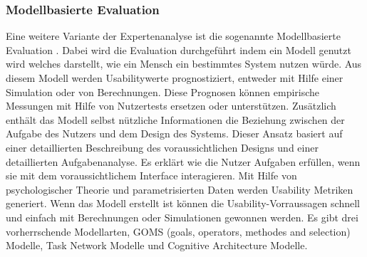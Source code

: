 \documentclass[draft=false
              ,paper=a4
              ,twoside=false
              ,fontsize=11pt
              ,headsepline
              ,BCOR10mm
              ,DIV11
              ]{scrbook}
\begin{document}
\subsubsection{Modellbasierte Evaluation} %
\label{ssub:modellbasierte_evaluation}
Eine weitere Variante der Expertenanalyse ist die sogenannte Modellbasierte Evaluation \cite{kieras_human-computer_2003}. Dabei wird die Evaluation durchgeführt indem ein Modell genutzt wird welches darstellt, wie ein Mensch ein bestimmtes System nutzen würde. Aus diesem Modell werden Usabilitywerte prognostiziert, entweder mit Hilfe einer Simulation oder von Berechnungen. Diese Prognosen können empirische Messungen mit Hilfe von Nutzertests ersetzen oder unterstützen. Zusätzlich enthält das Modell selbst nützliche Informationen die Beziehung zwischen der Aufgabe des Nutzers und dem Design des Systems.
Dieser Ansatz basiert auf einer detaillierten Beschreibung des voraussichtlichen Designs und einer detaillierten Aufgabenanalyse. Es erklärt wie die Nutzer Aufgaben erfüllen, wenn sie mit dem voraussichtlichem Interface interagieren. Mit Hilfe von psychologischer Theorie und parametrisierten Daten werden Usability Metriken generiert. Wenn das Modell erstellt ist können die Usability-Vorraussagen schnell und einfach mit Berechnungen oder Simulationen gewonnen werden.
Es gibt drei vorherrschende Modellarten, GOMS (goals, operators, methodes and selection) Modelle, Task Network Modelle und Cognitive Architecture Modelle.
\end{document}
